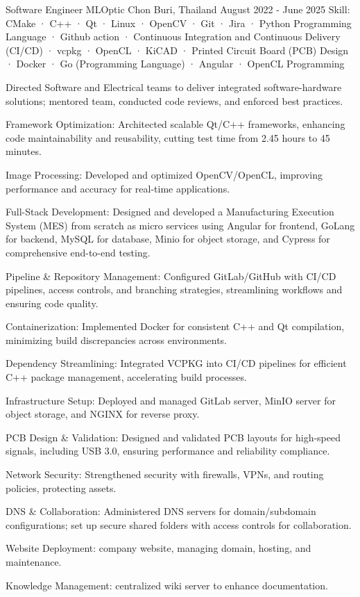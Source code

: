 \begin{cventries}
  \cventry
    {Software Engineer} %
    {MLOptic} %
    {Chon Buri, Thailand} %
    {August 2022 - June 2025} %
    {Skill: CMake · C++ · Qt · Linux · OpenCV · Git · Jira · Python Programming Language · Github action · Continuous Integration and Continuous Delivery (CI/CD) · vcpkg · OpenCL · KiCAD · Printed Circuit Board (PCB) Design · Docker · Go (Programming Language) · Angular · OpenCL Programming} %
    {
      \begin{cvitems} %
      \item {Directed Software and Electrical teams to deliver integrated software-hardware solutions; mentored team, conducted code reviews, and enforced best practices.}
      \item {Framework Optimization: Architected scalable Qt/C++ frameworks, enhancing code maintainability and reusability, cutting test time from 2.45 hours to 45 minutes.}
      \item {Image Processing: Developed and optimized OpenCV/OpenCL, improving performance and accuracy for real-time applications.}
      \item {Full-Stack Development: Designed and developed a Manufacturing Execution System (MES) from scratch as micro services using Angular for frontend, GoLang for backend, MySQL for database, Minio for object storage, and Cypress for comprehensive end-to-end testing.}
      \item {Pipeline \& Repository Management: Configured GitLab/GitHub with CI/CD pipelines, access controls, and branching strategies, streamlining workflows and ensuring code quality.}
      \item {Containerization: Implemented Docker for consistent C++ and Qt compilation, minimizing build discrepancies across environments.}
      \item {Dependency Streamlining: Integrated VCPKG into CI/CD pipelines for efficient C++ package management, accelerating build processes.}
      \item {Infrastructure Setup: Deployed and managed GitLab server, MinIO server for object storage, and NGINX for reverse proxy.}
      \item {PCB Design \& Validation: Designed and validated PCB layouts for high-speed signals, including USB 3.0, ensuring performance and reliability compliance.}
      \item {Network Security: Strengthened security with firewalls, VPNs, and routing policies, protecting assets.}
      \item {DNS \& Collaboration: Administered DNS servers for domain/subdomain configurations; set up secure shared folders with access controls for collaboration.}
      \item {Website Deployment: company website, managing domain, hosting, and maintenance.}
      \item {Knowledge Management: centralized wiki server to enhance documentation.}
      \end{cvitems}
    }


\end{cventries}

